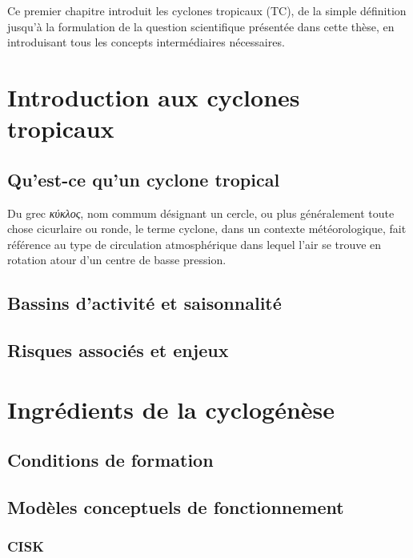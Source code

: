 \documentclass[../main.tex]{subfiles}
\begin{document}
\begin{itshape}
Ce premier chapitre introduit les cyclones tropicaux (TC), de la simple définition jusqu'à la formulation de la question scientifique présentée dans cette thèse, en introduisant tous les concepts intermédiaires nécessaires.
\end{itshape}

\minitoc
\section{Introduction aux cyclones tropicaux}

\subsection{Qu'est-ce qu'un cyclone tropical}

Du grec \textit{κύκλος}, nom commum désignant un cercle, ou plus généralement toute chose cicurlaire ou ronde, le terme cyclone, dans un contexte météorologique, fait référence au type de circulation atmosphérique dans lequel l'air se trouve en rotation atour d'un centre de basse pression.

\subsection{Bassins d'activité et saisonnalité}

\subsection{Risques associés et enjeux}

\section{Ingrédients de la cyclogénèse}
  
\subsection{Conditions de formation}

\subsection{Modèles conceptuels de fonctionnement}

\subsubsection{CISK}
\end{document}
